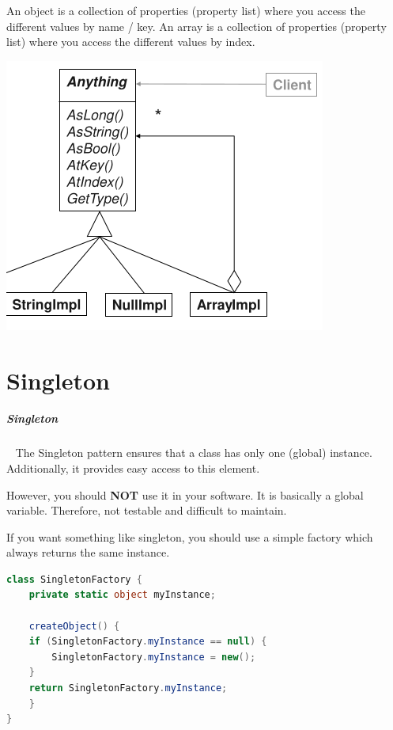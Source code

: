 \documentclass[11pt,twoside,landscape]{article}
\begin{document}
\begin{multicols}{3}
An object is a collection of properties (property list) where you access the different values by name / key.
An array is a collection of properties (property list) where you access the different values by index.


{
\begin{center}
\includegraphics[width=.9\linewidth]{img/anything_pattern.png}
\end{center}
\label{fig:anything-class-diagram}
}
\section{Singleton}
\label{sec:orgcbfcfca}
\subparagraph{Singleton} \
\label{sec:org9d165fe}
The Singleton pattern ensures that a class has only one (global) instance.
Additionally, it provides easy access to this element.

However, you should \textbf{NOT} use it in your software.
It is basically a global variable.
Therefore, not testable and difficult to maintain.

If you want something like singleton, you should use a simple factory which always returns the same instance.


\begin{lstlisting}[language=csharp,label=lst:singelton-alternative-in-code,caption={Singelton alternative in code},captionpos=b,numbers=none]
class SingletonFactory {
    private static object myInstance;

    createObject() {
	if (SingletonFactory.myInstance == null) {
	    SingletonFactory.myInstance = new();
	}
	return SingletonFactory.myInstance;
    }
}
\end{lstlisting}


\end{multicols}
\end{document}
